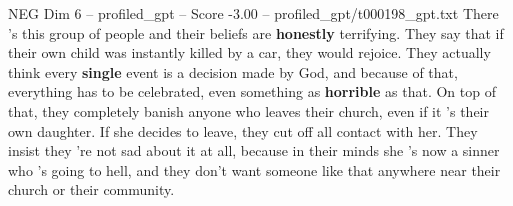 \begin{textsample}{NEG Dim 6 – profiled\_gpt – Score -3.00 – profiled\_gpt/t000198\_gpt.txt}  \label{ex:f6_neg_002}
There ’s this group of people and their beliefs are \textbf{honestly} terrifying.
They say that if their own child was instantly killed by a car, they would rejoice.
They actually think every \textbf{single} event is a decision made by God, and because of that, everything has to be celebrated, even something as \textbf{horrible} as that.
On top of that, they completely banish anyone who leaves their church, even if it ’s their own daughter.
If she decides to leave, they cut off all contact with her.
They insist they ’re not sad about it at all, because in their minds she ’s now a sinner who ’s going to hell, and they don't want someone like that anywhere near their church or their community.

\end{textsample}
